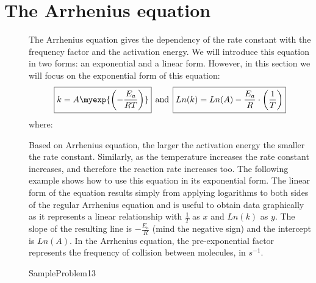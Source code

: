 \documentclass[main.tex]{subfiles}
\newcommand\chapterlabel{Ch-kinetics}
\begin{document}
\section{The Arrhenius equation}
\sloppy 
\begin{description}
\item[] 
The Arrhenius equation gives the dependency of the rate constant with the frequency factor and the activation energy. We will introduce this equation in two forms: an exponential and a linear form. However, in this section we will focus on the exponential form of this equation:
\begin{equation}
\boxed{ k=A\myexp{\left(-\frac{E_a}{RT}\right)}} \>\>\text{and} \>\> \boxed{  Ln(k)=Ln(A)  -\frac{E_a}{R} \cdot \left(\frac{1}{T}\right) }
\label{\chapterlabel:equation4}
\end{equation}
where:
Based on Arrhenius equation, the larger the activation energy the smaller the rate constant. Similarly, as the temperature increases the rate constant increases, and therefore the reaction rate increases too. The following example shows how to use this equation in its exponential form.
The linear form of the equation results simply from applying logarithms to both sides of the regular Arrhenius equation and is useful to obtain data graphically as it represents a linear relationship with $\frac{1}{T}$ as $x$ and $Ln(k)$ as $y$. The slope of the resulting line is $-\frac{E_a}{R}$ (mind the negative sign) and the intercept is $Ln(A)$. In the Arrhenius equation, the pre-exponential factor represents the frequency of collision between molecules, in $s^{-1}$. 


  {SampleProblem13}



\end{description}
\end{document}

